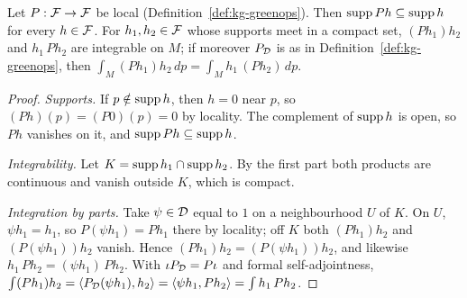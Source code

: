 \begin{lemma}\label{lem:kg-ibp}
Let $P:\mathcal F\to\mathcal F$ be local (Definition~\ref{def:kg-greenops}). Then $\operatorname{supp} Ph\subseteq\operatorname{supp} h$ for
every $h\in\mathcal F$. For $h_1,h_2\in\mathcal F$ whose supports meet in a compact set, $(Ph_1)h_2$ and $h_1\,Ph_2$
are integrable on $M$; if moreover $P_\mathcal D$ is as in Definition~\ref{def:kg-greenops}, then
$\int_M(Ph_1)h_2\,dp=\int_Mh_1\,(Ph_2)\,dp$.
\end{lemma}
\begin{proof}
\emph{Supports.} If $p\notin\operatorname{supp} h$, then $h=0$ near $p$, so $(Ph)(p)=(P0)(p)=0$ by locality. The
complement of $\operatorname{supp} h$ is open, so $Ph$ vanishes on it, and $\operatorname{supp} Ph\subseteq\operatorname{supp} h$.

\emph{Integrability.} Let $K=\operatorname{supp} h_1\cap\operatorname{supp} h_2$. By the first part both products are continuous
and vanish outside $K$, which is compact.

\emph{Integration by parts.} Take $\psi\in\mathcal D$ equal to $1$ on a neighbourhood $U$ of $K$. On $U$,
$\psi h_1=h_1$, so $P(\psi h_1)=Ph_1$ there by locality; off $K$ both $(Ph_1)h_2$ and
$(P(\psi h_1))h_2$ vanish. Hence $(Ph_1)h_2=(P(\psi h_1))h_2$, and likewise $h_1\,Ph_2=(\psi
h_1)\,Ph_2$. With $\iota P_\mathcal D=P\iota$ and formal self-adjointness,
$\int(Ph_1)h_2=\langle P_\mathcal D(\psi h_1),h_2\rangle=\langle\psi h_1,Ph_2\rangle=\int h_1\,Ph_2$.
\end{proof}

